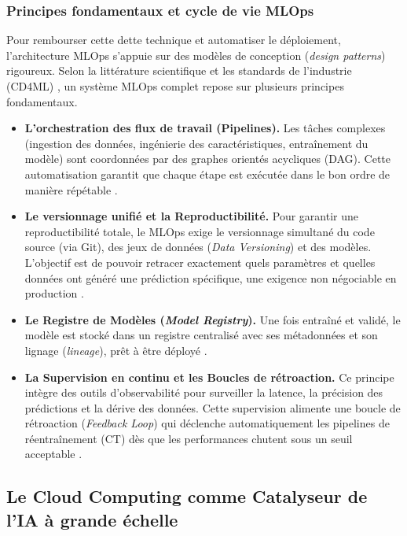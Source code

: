 \subsubsection{Principes fondamentaux et cycle de vie MLOps}
Pour rembourser cette dette technique et automatiser le déploiement, l'architecture MLOps s'appuie sur des modèles de conception (\textit{design patterns}) rigoureux. Selon la littérature scientifique \cite{85} et les standards de l'industrie (CD4ML) \cite{84}, un système MLOps complet repose sur plusieurs principes fondamentaux.
\begin{itemize}
    \item[$\bullet$] \textbf{L'orchestration des flux de travail (Pipelines).} Les tâches complexes (ingestion des données, ingénierie des caractéristiques, entraînement du modèle) sont coordonnées par des graphes orientés acycliques (DAG). Cette automatisation garantit que chaque étape est exécutée dans le bon ordre de manière répétable \cite{84, 85}.
    \item[$\bullet$] \textbf{Le versionnage unifié et la Reproductibilité.} Pour garantir une reproductibilité totale, le MLOps exige le versionnage simultané du code source (via Git), des jeux de données (\textit{Data Versioning}) et des modèles. L'objectif est de pouvoir retracer exactement quels paramètres et quelles données ont généré une prédiction spécifique, une exigence non négociable en production \cite{74, 85}.
    \item[$\bullet$] \textbf{Le Registre de Modèles (\textit{Model Registry}).} Une fois entraîné et validé, le modèle est stocké dans un registre centralisé avec ses métadonnées et son lignage (\textit{lineage}), prêt à être déployé \cite{84, 85}.
    \item[$\bullet$] \textbf{La Supervision en continu et les Boucles de rétroaction.} Ce principe intègre des outils d'observabilité pour surveiller la latence, la précision des prédictions et la dérive des données. Cette supervision alimente une boucle de rétroaction (\textit{Feedback Loop}) qui déclenche automatiquement les pipelines de réentraînement (CT) dès que les performances chutent sous un seuil acceptable \cite{84, 85}.
\end{itemize}


\subsection{Le Cloud Computing comme Catalyseur de l'IA à grande échelle}

